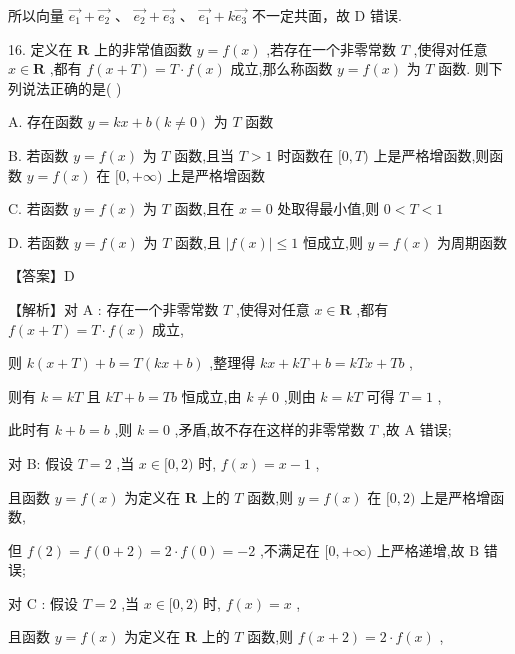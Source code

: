 \documentclass[10pt]{article}
\begin{document}
所以向量 \(\overrightarrow{{e}_{1}} + \overrightarrow{{e}_{2}}\text{ 、 }\overrightarrow{{e}_{2}} + \overrightarrow{{e}_{3}}\text{ 、 }\overrightarrow{{e}_{1}} + k\overrightarrow{{e}_{3}}\) 不一定共面，故 D 错误.

16. 定义在 \(\mathbf{R}\) 上的非常值函数 \(y = f\left( x\right)\) ,若存在一个非零常数 \(T\) ,使得对任意 \(x \in  \mathbf{R}\) ,都有 \(f\left( {x + T}\right)  = T \cdot  f\left( x\right)\) 成立,那么称函数 \(y = f\left( x\right)\) 为 \(T\) 函数. 则下列说法正确的是( )

A. 存在函数 \(y = {kx} + b\left( {k \neq  0}\right)\) 为 \(T\) 函数

B. 若函数 \(y = f\left( x\right)\) 为 \(T\) 函数,且当 \(T > 1\) 时函数在 \(\lbrack 0,T)\) 上是严格增函数,则函数 \(y = f\left( x\right)\) 在 \(\lbrack 0, + \infty )\) 上是严格增函数

C. 若函数 \(y = f\left( x\right)\) 为 \(T\) 函数,且在 \(x = 0\) 处取得最小值,则 \(0 < T < 1\)

D. 若函数 \(y = f\left( x\right)\) 为 \(T\) 函数,且 \(\left| {f\left( x\right) }\right|  \leq  1\) 恒成立,则 \(y = f\left( x\right)\) 为周期函数

【答案】D

【解析】对 \(\mathrm{A}\) : 存在一个非零常数 \(T\) ,使得对任意 \(x \in  \mathbf{R}\) ,都有 \(f\left( {x + T}\right)  = T \cdot  f\left( x\right)\) 成立,

则 \(k\left( {x + T}\right)  + b = T\left( {{kx} + b}\right)\) ,整理得 \({kx} + {kT} + b = {kTx} + {Tb}\) ,

则有 \(k = {kT}\) 且 \({kT} + b = {Tb}\) 恒成立,由 \(k \neq  0\) ,则由 \(k = {kT}\) 可得 \(T = 1\) ,

此时有 \(k + b = b\) ,则 \(k = 0\) ,矛盾,故不存在这样的非零常数 \(T\) ,故 A 错误;

对 B: 假设 \(T = 2\) ,当 \(x \in  \lbrack 0,2)\) 时, \(f\left( x\right)  = x - 1\) ,

且函数 \(y = f\left( x\right)\) 为定义在 \(\mathbf{R}\) 上的 \(T\) 函数,则 \(y = f\left( x\right)\) 在 \(\lbrack 0,2)\) 上是严格增函数,

但 \(f\left( 2\right)  = f\left( {0 + 2}\right)  = 2 \cdot  f\left( 0\right)  =  - 2\) ,不满足在 \(\lbrack 0, + \infty )\) 上严格递增,故 \(\mathrm{B}\) 错误;

对 \(\mathrm{C}\) : 假设 \(T = 2\) ,当 \(x \in  \lbrack 0,2)\) 时, \(f\left( x\right)  = x\) ,

且函数 \(y = f\left( x\right)\) 为定义在 \(\mathbf{R}\) 上的 \(T\) 函数,则 \(f\left( {x + 2}\right)  = 2 \cdot  f\left( x\right)\) ,
\end{document}

